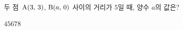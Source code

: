 두 점~$\mathrm{A}(3,\mkern3mu 3)$, $\mathrm{B}(a,\mkern3mu 0)$ 사이의 거리가 $5$일 때, 양수 $a$의 값은?
\begin{choices32}{$4$}{$5$}{$6$}{$7$}{$8$}\end{choices32}
